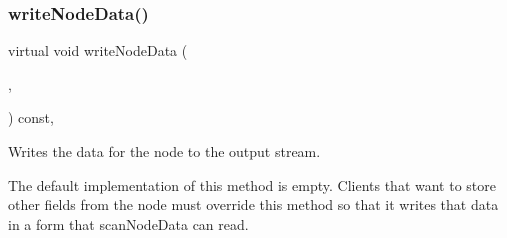 \subsubsection{\texorpdfstring{write\+Node\+Data()}{writeNodeData()}}
{\footnotesize\ttfamily virtual void write\+Node\+Data (\begin{DoxyParamCaption}\item[{std\+::ostream \&}]{,  }\item[{Node\+Type $\ast$}]{ }\end{DoxyParamCaption}) const\hspace{0.3cm}{\ttfamily [inline]}, {\ttfamily [virtual]}}



Writes the data for the node to the output stream. 

The default implementation of this method is empty. Clients that want to store other fields from the node must override this method so that it writes that data in a form that scan\+Node\+Data can read. 